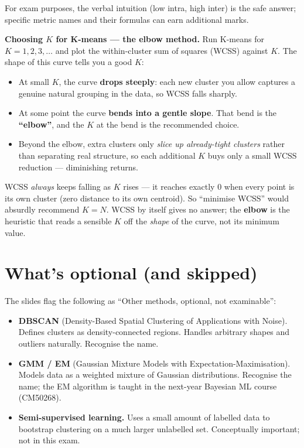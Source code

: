 \documentclass[11pt, a4paper]{article}
\begin{document}
For exam purposes, the verbal intuition (low intra, high inter) is the safe answer; specific metric names and their formulas can earn additional marks.

\textbf{Choosing $K$ for K-means --- the elbow method.} Run K-means for $K = 1, 2, 3, \ldots$ and plot the within-cluster sum of squares (WCSS) against $K$. The shape of this curve tells you a good $K$:
\begin{itemize}
  \item At small $K$, the curve \textbf{drops steeply}: each new cluster you allow captures a genuine natural grouping in the data, so WCSS falls sharply.
  \item At some point the curve \textbf{bends into a gentle slope}. That bend is the \textbf{``elbow''}, and the $K$ at the bend is the recommended choice.
  \item Beyond the elbow, extra clusters only \emph{slice up already-tight clusters} rather than separating real structure, so each additional $K$ buys only a small WCSS reduction --- diminishing returns.
\end{itemize}

\begin{pitfallbox}
WCSS \emph{always} keeps falling as $K$ rises --- it reaches exactly $0$ when every point is its own cluster (zero distance to its own centroid). So ``minimise WCSS'' would absurdly recommend $K = N$. WCSS by itself gives no answer; the \textbf{elbow} is the heuristic that reads a sensible $K$ off the \emph{shape} of the curve, not its minimum value.
\end{pitfallbox}

\section{What's optional (and skipped)}

The slides flag the following as ``Other methods, optional, not examinable'':

\begin{itemize}
  \item \textbf{DBSCAN} (Density-Based Spatial Clustering of Applications with Noise). Defines clusters as density-connected regions. Handles arbitrary shapes and outliers naturally. Recognise the name.
  \item \textbf{GMM / EM} (Gaussian Mixture Models with Expectation-Maximisation). Models data as a weighted mixture of Gaussian distributions. Recognise the name; the EM algorithm is taught in the next-year Bayesian ML course (CM50268).
  \item \textbf{Semi-supervised learning.} Uses a small amount of labelled data to bootstrap clustering on a much larger unlabelled set. Conceptually important; not in this exam.
\end{itemize}
\end{document}
